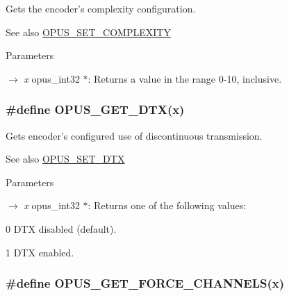 Gets the encoder's complexity configuration. \begin{DoxySeeAlso}{See also}
\hyperlink{group__opus__encoderctls_ga3483877bf1687a75dd4a1de6f85f291c}{OPUS\_\-SET\_\-COMPLEXITY} 
\end{DoxySeeAlso}

\begin{DoxyParams}{Parameters}
\item[\mbox{$\rightarrow$} {\em x}]{\ttfamily opus\_\-int32 $\ast$}: Returns a value in the range 0-\/10, inclusive. \end{DoxyParams}
\hypertarget{group__opus__encoderctls_gaafbb44454e9f57232b85e4e087337ded}{
\subsubsection[{OPUS\_\-GET\_\-DTX}]{\setlength{\rightskip}{0pt plus 5cm}\#define OPUS\_\-GET\_\-DTX(x)}}
\label{group__opus__encoderctls_gaafbb44454e9f57232b85e4e087337ded}


Gets encoder's configured use of discontinuous transmission. \begin{DoxySeeAlso}{See also}
\hyperlink{group__opus__encoderctls_ga4f053b2db8c5162293213aabfe123773}{OPUS\_\-SET\_\-DTX} 
\end{DoxySeeAlso}

\begin{DoxyParams}{Parameters}
\item[\mbox{$\rightarrow$} {\em x}]{\ttfamily opus\_\-int32 $\ast$}: Returns one of the following values: 
\begin{DoxyDescription}
\item[0]DTX disabled (default). 
\item[1]DTX enabled. 
\end{DoxyDescription}\end{DoxyParams}
\hypertarget{group__opus__encoderctls_ga21f010167c5dfa1b53f20c46d473e86a}{
\subsubsection[{OPUS\_\-GET\_\-FORCE\_\-CHANNELS}]{\setlength{\rightskip}{0pt plus 5cm}\#define OPUS\_\-GET\_\-FORCE\_\-CHANNELS(x)}}
\label{group__opus__encoderctls_ga21f010167c5dfa1b53f20c46d473e86a}


